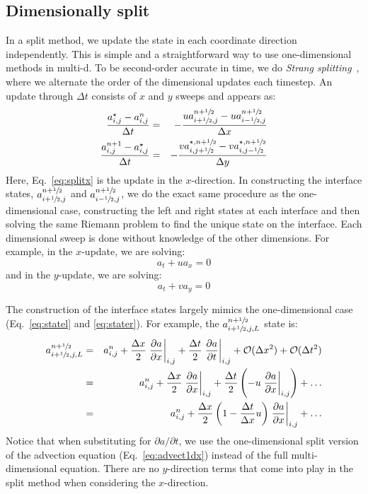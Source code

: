 \subsection{Dimensionally split}

In a split method, we update the state in each coordinate direction
independently.  This is simple and a straightforward way to use
one-dimensional methods in multi-d.  To be second-order accurate in
time, we do {\em Strang splitting}~\cite{strang}, where we alternate
the order of the dimensional updates each timestep.  An update through
$\Delta t$ consists of $x$ and $y$ sweeps and appears as:
\begin{eqnarray}
 \frac{a_{i,j}^\star - a_{i,j}^n}{\Delta t} &=&
  - \frac{ u a_{i+{\sfrac{1}{2}},j}^{n+{\sfrac{1}{2}}} - u a_{i-{\sfrac{1}{2}},j}^{n+{\sfrac{1}{2}}} }{\Delta x} \label{eq:splitx}\\
 \frac{a_{i,j}^{n+1} - a_{i,j}^\star}{\Delta t} &=&
  - \frac{ v a_{i,j+{\sfrac{1}{2}}}^{\star,n+{\sfrac{1}{2}}} - v a_{i,j-{\sfrac{1}{2}}}^{\star,n+{\sfrac{1}{2}}} }{\Delta y} \label{eq:splity}
\end{eqnarray}
Here, Eq.~\ref{eq:splitx} is the update in the $x$-direction.  In
constructing the interface states, $a_{i+{\sfrac{1}{2}},j}^{n+{\sfrac{1}{2}}}$ and
$a_{i-{\sfrac{1}{2}},j}^{n+{\sfrac{1}{2}}}$, we do the exact same procedure as the
one-dimensional case, constructing the left and right states at each
interface and then solving the same Riemann problem to find the unique
state on the interface.  Each dimensional sweep is done without
knowledge of the other dimensions.  For example, in the $x$-update, we
are solving:
\begin{equation}
a_t + u a_x = 0
\label{eq:advect1dx}
\end{equation}
and in the $y$-update, we are solving:
\begin{equation}
a_t + v a_y = 0
\end{equation}

The construction of the interface states largely mimics the one-dimensional
case (Eq.~\ref{eq:statel} and \ref{eq:stater}).  For example, the
$a_{i+{\sfrac{1}{2}},j,L}^{n+{\sfrac{1}{2}}}$ state is:
\begin{eqnarray}
a_{i+{\sfrac{1}{2}},j,L}^{n+{\sfrac{1}{2}}} &=& a_{i,j}^n + 
  \frac{\Delta x}{2} \left .\frac{\partial a}{\partial x} \right |_{i,j} + 
  \frac{\Delta t}{2} \left .\frac{\partial a}{\partial t} \right |_{i,j} + 
  \mathcal{O}(\Delta x^2) + \mathcal{O}(\Delta t^2) \nonumber \\
 &=& a_{i,j}^n + 
   \frac{\Delta x}{2} \left .\frac{\partial a}{\partial x} \right |_{i,j} + 
   \frac{\Delta t}{2} \left ( 
   - u \left .\frac{\partial a}{\partial x} \right |_{i,j} \right
   ) + \ldots \nonumber \\
    &=& a_{i,j}^n + 
   \frac{\Delta x}{2} \left ( 1 - \frac{\Delta t}{\Delta x} u \right ) 
   \left .\frac{\partial a}{\partial x} \right |_{i,j} +
   \ldots \label{eq:statels}
\end{eqnarray}
Notice that when substituting for $\partial a / \partial t$, we use
the one-dimensional split version of the advection equation
(Eq.~\ref{eq:advect1dx}) instead of the full multi-dimensional
equation.  There are no $y$-direction terms that come into play in the
split method when considering the $x$-direction.

